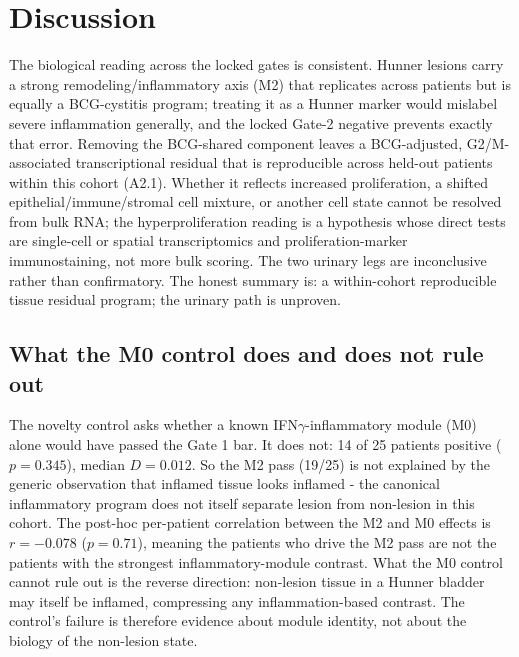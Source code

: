 \documentclass[11pt,a4paper]{article}
\begin{document}
\section{Discussion}
The biological reading across the locked gates is consistent. Hunner lesions
carry a strong remodeling/inflammatory axis (M2) that replicates across
patients but is equally a BCG-cystitis program; treating it as a Hunner marker
would mislabel severe inflammation generally, and the locked Gate-2 negative
prevents exactly that error. Removing the BCG-shared component leaves a
BCG-adjusted, G2/M-associated transcriptional residual that is reproducible
across held-out patients within this cohort (A2.1). Whether it reflects
increased proliferation, a shifted epithelial/immune/stromal cell mixture, or
another cell state cannot be resolved from bulk RNA; the hyperproliferation
reading is a hypothesis whose direct tests are single-cell or spatial
transcriptomics and proliferation-marker immunostaining, not more bulk
scoring. The two urinary legs are inconclusive rather than confirmatory. The
honest summary is: a within-cohort reproducible tissue residual program; the
urinary path is unproven.

\subsection{What the M0 control does and does not rule out}
The novelty control asks whether a known IFN$\gamma$-inflammatory module
(M0) alone would have passed the Gate 1 bar. It does not: 14 of 25 patients
positive ($p=0.345$), median $D=0.012$. So the M2 pass (19/25) is not
explained by the generic observation that inflamed tissue looks inflamed -
the canonical inflammatory program does not itself separate lesion from
non-lesion in this cohort. The post-hoc per-patient correlation between the
M2 and M0 effects is $r=-0.078$ ($p=0.71$), meaning the patients who drive
the M2 pass are not the patients with the strongest inflammatory-module
contrast. What the M0 control cannot rule out is the reverse direction:
non-lesion tissue in a Hunner bladder may itself be inflamed, compressing any
inflammation-based contrast. The control's failure is therefore evidence
about module identity, not about the biology of the non-lesion state.
\end{document}
